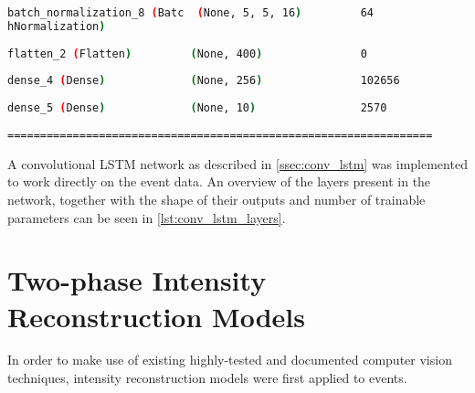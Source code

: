 \begin{lstlisting}[language=Bash,caption={Overview of layers in Convolutional LTSM network},label={lst:conv_lstm_layers},numbers=none]
batch_normalization_8 (Batc  (None, 5, 5, 16)         64        
hNormalization)                                                 
                                                                
flatten_2 (Flatten)         (None, 400)               0         
                                                                
dense_4 (Dense)             (None, 256)               102656    
                                                                
dense_5 (Dense)             (None, 10)                2570      
                                                                
=================================================================
\end{lstlisting}

A convolutional LSTM network as described in \cref{ssec:conv_lstm} was implemented to work directly on the event data. An overview of the layers present in the network, together with the shape of their outputs and number of trainable parameters can be seen in \cref{lst:conv_lstm_layers}.

\section{Two-phase Intensity Reconstruction Models}

In order to make use of existing highly-tested and documented computer vision techniques, intensity reconstruction models were first applied to events.